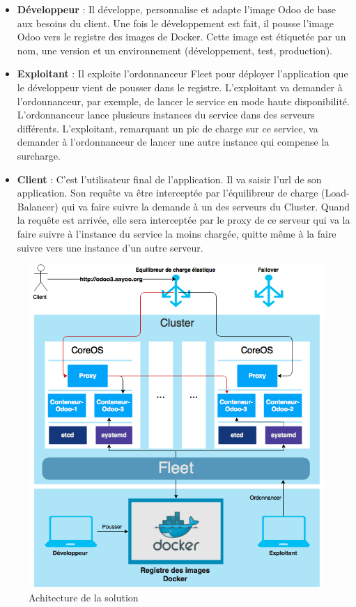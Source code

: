 \begin{onehalfspace}
\begin{itemize}
 	\item \textbf{Développeur} : Il développe, personnalise et adapte l'image Odoo de base aux besoins du client. Une fois le développement est fait, il pousse l'image Odoo vers le registre des images de Docker. Cette image est étiquetée par un nom, une version et un environnement (développement, test, production).
 	\item \textbf{Exploitant} : Il exploite l'ordonnanceur Fleet pour déployer l'application que le développeur vient de pousser dans le registre. L'exploitant va demander à l'ordonnanceur, par exemple, de lancer le service en mode haute disponibilité. L'ordonnanceur lance plusieurs instances du service dans des serveurs différents. L'exploitant, remarquant un pic de charge sur ce service, va demander à l'ordonnanceur de lancer une autre instance qui compense la surcharge.
 	\item \textbf{Client} : C'est l'utilisateur final de l'application. Il va saisir l'\acrshort{url} de son application. Son requête va être interceptée par l'équilibreur de charge (Load-Balancer) qui va faire suivre la demande à un des serveurs du Cluster. Quand la requête est arrivée, elle sera interceptée par le proxy de ce serveur qui va la faire suivre à l'instance du service la moins chargée, quitte même à la faire suivre vers une instance d'un autre serveur.
 \end{itemize} 

\begin{figure}[H]
\centering
\includegraphics [scale=0.7]{chapitre4/assets/architecture}
\caption{Achitecture de la solution}
\label{fig:architecture}
\end{figure}


\end{onehalfspace}
